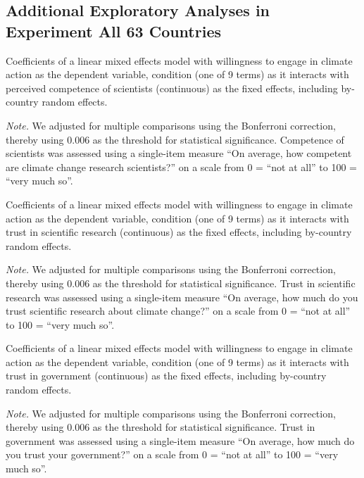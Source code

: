     \subsection{Additional Exploratory Analyses in Experiment All 63 Countries}

\begin{table}[H] 
\caption{Coefficients of a linear mixed effects model with willingness to engage in climate action as the dependent variable, condition (one of 9 terms) as it interacts with perceived competence of scientists (continuous) as the fixed effects, including by-country random effects. }
 
\end{table}
\textit{Note.} We adjusted for multiple comparisons using the Bonferroni correction, thereby using 0.006 as the threshold for statistical significance. Competence of scientists was assessed using a single-item measure “On average, how competent are climate change research scientists?” on a scale from 0 = “not at all” to 100 = “very much so”.

\begin{table}[H] 
\caption{Coefficients of a linear mixed effects model with willingness to engage in climate action as the dependent variable, condition (one of 9 terms) as it interacts with trust in scientific research (continuous) as the fixed effects, including by-country random effects.}
 
\end{table}
\textit{Note.} We adjusted for multiple comparisons using the Bonferroni correction, thereby using 0.006 as the threshold for statistical significance. Trust in scientific research was assessed using a single-item measure “On average, how much do you trust scientific research about climate change?” on a scale from 0 = “not at all” to 100 = “very much so”.

\begin{table}[H] 
\caption{Coefficients of a linear mixed effects model with willingness to engage in climate action as the dependent variable, condition (one of 9 terms) as it interacts with trust in government (continuous) as the fixed effects, including by-country random effects.}
 
\end{table}
\textit{Note.} We adjusted for multiple comparisons using the Bonferroni correction, thereby using 0.006 as the threshold for statistical significance. Trust in government was assessed using a single-item measure “On average, how much do you trust your government?” on a scale from 0 = “not at all” to 100 = “very much so”.

